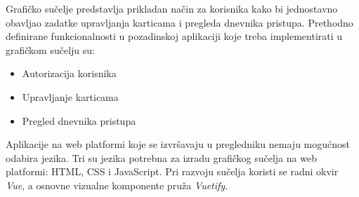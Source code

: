 Grafičko sučelje predstavlja prikladan način za korisnika kako bi jednostavno obavljao zadatke upravljanja karticama
i pregleda dnevnika pristupa.
Prethodno definirane funkcionalnosti u pozadinskoj aplikaciji koje treba implementirati u grafičkom sučelju su:

\begin{itemize}
    \item Autorizacija korisnika
    \item Upravljanje karticama
    \item Pregled dnevnika pristupa
\end{itemize}

Aplikacije na web platformi koje se izvršavaju u pregledniku nemaju mogućnost odabira jezika.
Tri su jezika potrebna za izradu grafičkog sučelja na web platformi: HTML, CSS i JavaScript.
Pri razvoju sučelja koristi se radni okvir \textit{Vue}, a osnovne vizualne komponente pruža \textit{Vuetify}.

